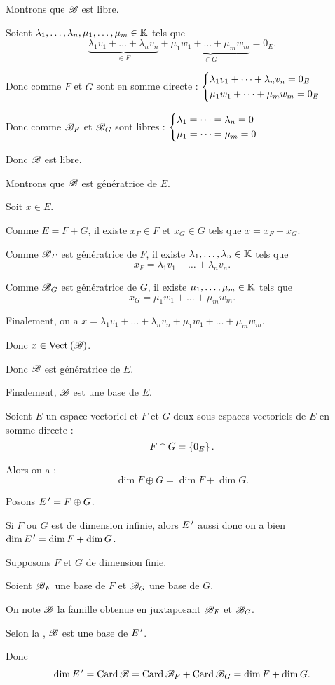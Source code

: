 \begin{dem}
Montrons que \(\mathscr{B}\) est libre.

Soient \(\lambda_1,\dots,\lambda_n,\mu_1,\dots,\mu_m\in\mathbb{K}\) tels que \[\underbrace{\lambda_1v_1+\dots+\lambda_nv_n}_{\in F}+\underbrace{\mu_1w_1+\dots+\mu_mw_m}_{\in G}=0_E.\]

Donc comme \(F\) et \(G\) sont en somme directe : \(\begin{dcases}
\lambda_1v_1+\dots+\lambda_nv_n=0_E \\
\mu_1w_1+\dots+\mu_mw_m=0_E
\end{dcases}\)

Donc comme \(\mathscr{B}_F\) et \(\mathscr{B}_G\) sont libres : \(\begin{dcases}
\lambda_1=\dots=\lambda_n=0 \\
\mu_1=\dots=\mu_m=0
\end{dcases}\)

Donc \(\mathscr{B}\) est libre.

Montrons que \(\mathscr{B}\) est génératrice de \(E\).

Soit \(x\in E\).

Comme \(E=F+G\), il existe \(x_F\in F\) et \(x_G\in G\) tels que \(x=x_F+x_G\).

Comme \(\mathscr{B}_F\) est génératrice de \(F\), il existe \(\lambda_1,\dots,\lambda_n\in\mathbb{K}\) tels que \[x_F=\lambda_1v_1+\dots+\lambda_nv_n.\]

Comme \(\mathscr{B}_G\) est génératrice de \(G\), il existe \(\mu_1,\dots,\mu_m\in\mathbb{K}\) tels que \[x_G=\mu_1w_1+\dots+\mu_mw_m.\]

Finalement, on a \(x=\lambda_1v_1+\dots+\lambda_nv_n+\mu_1w_1+\dots+\mu_mw_m\).

Donc \(x\in\Vect{\fami{B}}\).

Donc \(\mathscr{B}\) est génératrice de \(E\).

Finalement, \(\mathscr{B}\) est une base de \(E\).
\end{dem}

\begin{cor}
Soient \(E\) un espace vectoriel et \(F\) et \(G\) deux sous-espaces vectoriels de \(E\) en somme directe : \[F\cap G=\left\lbrace0_E\right\rbrace.\]

Alors on a : \[\dim F\oplus G=\dim F+\dim G.\]
\end{cor}

\begin{dem}
Posons \(E^{\,\prime}=F\oplus G\).

Si \(F\) ou \(G\) est de dimension infinie, alors \(E^{\,\prime}\) aussi donc on a bien \(\dim E^{\,\prime}=\dim F+\dim G\).

Supposons \(F\) et \(G\) de dimension finie.

Soient \(\mathscr{B}_F\) une base de \(F\) et \(\mathscr{B}_G\) une base de \(G\).

On note \(\mathscr{B}\) la famille obtenue en juxtaposant \(\mathscr{B}_F\) et \(\mathscr{B}_G\).

Selon la , \(\mathscr{B}\) est une base de \(E^{\,\prime}\).

Donc \[\dim E^{\,\prime}=\operatorname{Card}\mathscr{B}=\operatorname{Card}\mathscr{B}_F+\operatorname{Card}\mathscr{B}_G=\dim F+\dim G.\]
\end{dem}

